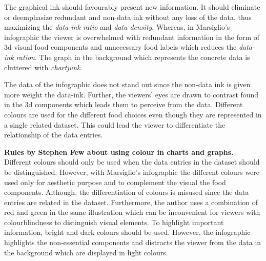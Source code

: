 The graphical ink should favourably present new information. It should eliminate
or deemphasize redundant and non-data ink without any loss of the data, thus
maximizing the \textit{data-ink ratio} and \textit{data density}. Whereas, in
Marsiglio's infographic the viewer is overwhelmed with redundant information in
the form of 3d visual food components and unnecessary food labels which reduces
the \textit{data-ink ration}. The graph in the background which represents the
concrete data is cluttered with \textit{chartjunk}.

The data of the infographic does not stand out since the non-data ink is given
more weight the data-ink. Further, the viewers' eyes are drawn to contrast found
in the 3d components which leads them to perceive from the data. Different
colours are used for the different food choices even though they are represented
in a single related dataset. This could lead the viewer to differentiate the
relationship of the data entries.

\textbf{Rules by Stephen Few about using colour in charts and
graphs.}~\cite{Stephen2004} Different colours should only be used when the data
entries in the dataset should be distinguished. However, with Marsiglio's
infographic the different colours were used only for aesthetic purpose and to
complement the visual the food components. Although, the differentiation of
colours is misused since the data entries are related in the dataset.
Furthermore, the author uses a combination of red and green in the same
illustration which can be inconvenient for viewers with colourblindness to
distinguish visual elements. To highlight important information, bright and dark
colours should be used. However, the infographic highlights the non-essential
components and distracts the viewer from the data in the background which are
displayed in light colours.
